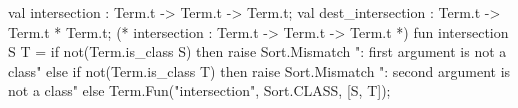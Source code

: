 \nwenddocs{}\plusendmoddef\nwstartdeflinemarkup{}\nwenddeflinemarkup
val intersection : Term.t -> Term.t -> Term.t;
val dest_intersection : Term.t -> Term.t * Term.t;
\nwendcode{}\nwdocspar
\nwenddocs{}\endmoddef\nwstartdeflinemarkup{}\nwenddeflinemarkup
(* intersection : Term.t -> Term.t -> Term.t *)
fun intersection S T =
  if not(Term.is_class S)
  then raise Sort.Mismatch ": first argument is not a class"
  else if not(Term.is_class T)
  then raise Sort.Mismatch ": second argument is not a class"
  else Term.Fun("intersection", Sort.CLASS, [S, T]);

